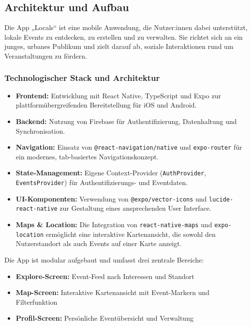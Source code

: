\subsection{Architektur und Aufbau}
Die App „Locals“ ist eine mobile Anwendung, die Nutzer:innen dabei unterstützt,
lokale Events zu entdecken, zu erstellen und zu verwalten. Sie richtet sich an
ein junges, urbanes Publikum und zielt darauf ab, soziale Interaktionen rund um
Veranstaltungen zu fördern.

\subsubsection{Technologischer Stack und Architektur}

\begin{itemize}
    \item \textbf{Frontend:} Entwicklung mit React Native, TypeScript und Expo zur plattformübergreifenden Bereitstellung für iOS und Android.
    \item \textbf{Backend:} Nutzung von Firebase für Authentifizierung, Datenhaltung und Synchronisation.
    \item \textbf{Navigation:} Einsatz von \texttt{@react-navigation/native} und \texttt{expo-router} für ein modernes, tab-basiertes Navigationskonzept.
    \item \textbf{State-Management:} Eigene Context-Provider (\texttt{AuthProvider}, \texttt{EventsProvider}) für Authentifizierungs- und Eventdaten.
    \item \textbf{UI-Komponenten:} Verwendung von \texttt{@expo/vector-icons} und \texttt{lucide-react-native} zur Gestaltung eines ansprechenden User Interface.
    \item \textbf{Maps \& Location:} Die Integration von \texttt{react-native-maps} und \texttt{expo-location} ermöglicht eine interaktive Kartenansicht, die sowohl den Nutzerstandort als auch Events auf einer Karte anzeigt.
\end{itemize}

Die App ist modular aufgebaut und umfasst drei zentrale Bereiche:
\begin{itemize}
    \item \textbf{Explore-Screen:} Event-Feed nach Interessen und Standort
    \item \textbf{Map-Screen:} Interaktive Kartenansicht mit Event-Markern und Filterfunktion
    \item \textbf{Profil-Screen:} Persönliche Eventübersicht und Verwaltung
\end{itemize}

